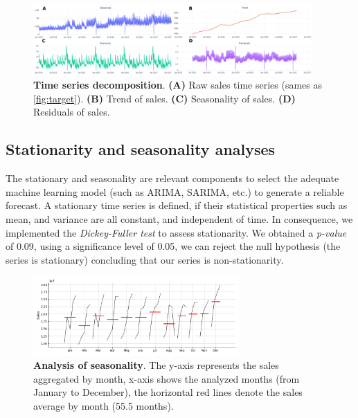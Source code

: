 \begin{figure}[!htb]
  \centering
  \includegraphics[width=0.95\textwidth]{plots/eda/timseries_decomposition.png}
  \caption[Time series decomposition]{\textbf{Time series decomposition}. \textbf{(A)} Raw sales time series (sames as \autoref{fig:target}). \textbf{(B)} Trend of sales. \textbf{(C)} Seasonality of sales. \textbf{(D)} Residuals of sales. }
  \label{fig:ts-decomposition}
\end{figure}

\subsection[Stationarity and seasonality analyses]{Stationarity and seasonality analyses}
\label{sec:st_s_analysis}

The stationary and seasonality are relevant components to select the adequate machine learning model (such as ARIMA, SARIMA, etc.) to generate a reliable forecast. A stationary time series is defined, if their statistical properties such as mean, and variance are all constant, and independent of time.\autocite{moroff2021machine,feizabadi2022machine} In consequence, we implemented the \textit{Dickey-Fuller test} to assess stationarity. We obtained a \textit{p-value} of 0.09, using a significance level of 0.05, we can reject the null hypothesis (the series is stationary) concluding that our series is non-stationarity.


\begin{figure}[!htb]
  \centering
  \includegraphics[width=0.7\textwidth]{plots/eda/seasonal_analysis.png}
  \caption[Analysis of seasonality]{\textbf{Analysis of seasonality}. The y-axis represents the sales aggregated by month, x-axis shows the analyzed months (from January to December), the horizontal red lines denote the sales average by month (55.5 months).}
  \label{fig:seasonal_plot}
\end{figure}

